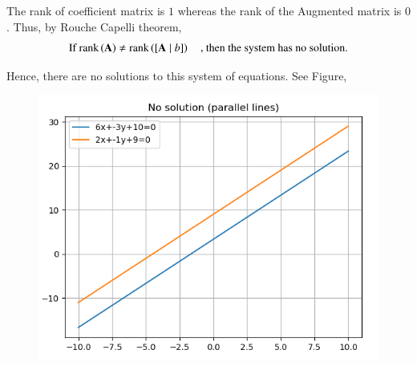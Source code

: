 \documentclass[journal]{IEEEtran}
\begin{document}
The rank of coefficient matrix is $1$ whereas the rank of the Augmented matrix is $0$. Thus, by Rouche Capelli theorem,\\
\begin{align}
    \text{If rank}\left(\mathbf{A}\right) \neq \text{rank}\left([\mathbf{A} \mid b]\right)\quad\text{, then the system has no solution.}
\end{align}


Hence, there are no solutions to this system of equations.
\newpage
See Figure,
\begin{figure}[h!]
    \centering
    \includegraphics[height=0.5\textheight, keepaspectratio]{figs/fig.png}
    \label{figure_1}
\end{figure}
\end{document}
